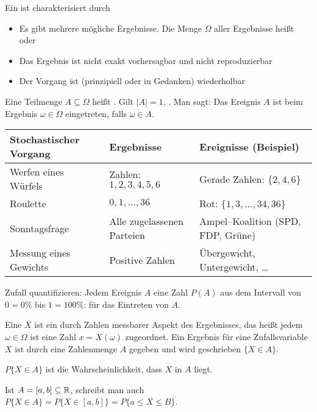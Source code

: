 

Ein  ist charakterisiert durch
\begin{itemize}
    \item{Es gibt mehrere mögliche Ergebnisse. Die Menge $\Omega$ aller Ergebnisse heißt  oder }
    \item{Das Ergebnis ist nicht exakt vorhersagbar und nicht reproduzierbar}
    \item{Der Vorgang ist (prinzipiell oder in Gedanken) wiederholbar}
\end{itemize}
Eine Teilmenge $A \subseteq \Omega$ heißt . Gilt $|A| = 1$, . Man sagt: Das Ereignis $A$ ist beim Ergebnis $\omega \in \Omega$ eingetreten, falls $\omega \in A$.

\begin{center}
\begin{tabular}{l|l|l}
\textbf{Stochastischer Vorgang} & \textbf{Ergebnisse} & \textbf{Ereignisse (Beispiel)} \\ \hline
Werfen eines Würfels & Zahlen: $1, 2, 3, 4, 5, 6$ & Gerade Zahlen: $\{2, 4, 6\}$ \\
Roulette & $0, 1, \dots, 36$ & Rot: $\{1, 3, \dots, 34, 36\}$ \\
\glqq{}Sonntagsfrage\grqq{} & Alle zugelassenen Parteien & Ampel--Koalition (SPD, FDP, Grüne) \\
Messung eines Gewichts & Positive Zahlen & Übergewicht, Untergewicht, \dots
\end{tabular}
\end{center}
Zufall quantifizieren: Jedem Ereignis $A$ eine Zahl $P(A)$ aus dem Intervall von $0 = 0\%{}$ bis $1 = 100\%{}$:  für das Eintreten von $A$.

Eine  $X$ ist ein durch Zahlen messbarer Aspekt des Ergebnisses, das heißt jedem $\omega \in \Omega$ ist eine Zahl $x = X(\omega)$ zugeordnet. Ein Ergebnis für eine Zufallsvariable $X$ ist durch eine Zahlenmenge $A$ gegeben und wird geschrieben $\{X \in A\}$.

$P\{X \in A\}$ ist die Wahrscheinlichkeit, dass $X$ in $A$ liegt.

Ist $A = [a, b] \subseteq \mathbb{R}$, schreibt man auch $P\{X \in A\} = P\{X \in [a, b]\} = P\{a \leq X \leq B\}$.

